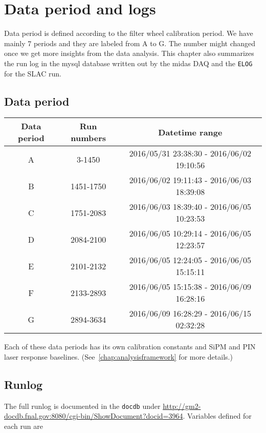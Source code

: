 \chapter{Data period and logs}
\label{chap:runlog}

Data period is defined according to the filter wheel calibration period. We have mainly 7 periods and they are labeled from A to G.  The number might changed once we get more insights from the data analysis. This chapter also summarizes the run log in the mysql database written out by the \ac{midas} DAQ and the \verb+ELOG+ for the SLAC run.

\section{Data period}

\begin{table}[htbp]
\begin{longtable}{|c|c|c|} \hline
Data period &  Run numbers & Datetime range \\ \hline
A & 3-1450 & 2016/05/31 23:38:30 - 2016/06/02 19:10:56 \\ \hline
B & 1451-1750 & 2016/06/02 19:11:43  - 2016/06/03 18:39:08 \\ \hline
C & 1751-2083 & 2016/06/03 18:39:40 - 2016/06/05 10:23:53 \\ \hline
D & 2084-2100 & 2016/06/05 10:29:14 - 2016/06/05 12:23:57 \\ \hline
E & 2101-2132 & 2016/06/05 12:24:05 - 2016/06/05 15:15:11 \\ \hline
F & 2133-2893 & 2016/06/05 15:15:38 - 2016/06/09 16:28:16 \\ \hline
G & 2894-3634 & 2016/06/09 16:28:29 - 2016/06/15 02:32:28 \\ \hline
\end{longtable}
\end{table}

Each of these data periods has its own calibration constants and SiPM and PIN laser response baselines.
(See~\cref{chap:analysisframework} for more details.)

\section{Runlog}

The full runlog is documented in the \verb+docdb+ under \url{http://gm2-docdb.fnal.gov:8080/cgi-bin/ShowDocument?docid=3964}.
Variables defined for each run are

